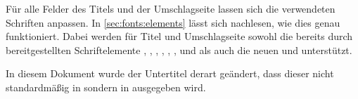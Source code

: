 \begin{Declaration*}{}
\begin{Declaration*}{}
\begin{Declaration*}{}
\begin{Declaration}[v2.02]{}
\begin{Declaration}[v2.02]{}
Für alle Felder des Titels und der Umschlagseite lassen sich die verwendeten
Schriften anpassen. In \autoref{sec:fonts:elements} lässt sich nachlesen, wie 
dies genau funktioniert. Dabei werden für Titel und Umschlagseite sowohl die 
bereits durch \KOMAScript{} bereitgestellten Schriftelemente , 
, , , , , 
 und  als auch die neuen  und 
 unterstützt.
%
\begin{Example}
In diesem Dokument wurde der Untertitel derart geändert, dass dieser nicht 
standardmäßig in \DIN sondern in  ausgegeben wird.
\begin{Code}[escapechar=§]
\end{Code}
\end{Example}
\end{Declaration}
\end{Declaration}


\end{Declaration*}
\end{Declaration*}
\end{Declaration*}
